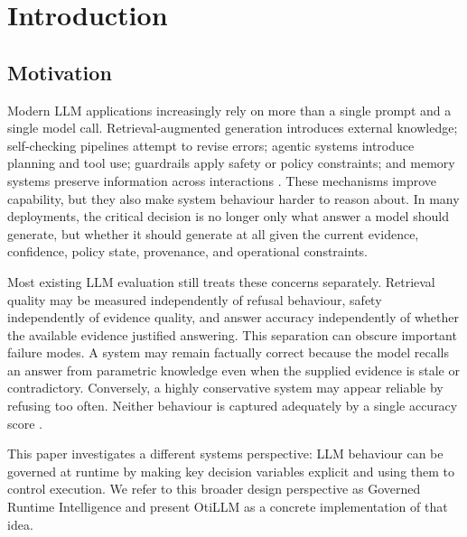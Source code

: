 \documentclass[manuscript, screen, review]{jair}
\begin{document}
\maketitle


\section{Introduction}
\subsection{Motivation}

Modern LLM applications increasingly rely on more than a single prompt and a
single model call. Retrieval-augmented generation introduces external
knowledge; self-checking pipelines attempt to revise errors; agentic systems
introduce planning and tool use; guardrails apply safety or policy constraints;
and memory systems preserve information across interactions \citep{lewis2020rag,yao2023react,dong2024safeguarding,plaat2025agentic}. These mechanisms
improve capability, but they also make system behaviour harder to reason about.
In many deployments, the critical decision is no longer only what answer a
model should generate, but whether it should generate at all given the current
evidence, confidence, policy state, provenance, and operational constraints.

Most existing LLM evaluation still treats these concerns separately. Retrieval
quality may be measured independently of refusal behaviour, safety independently
of evidence quality, and answer accuracy independently of whether the available
evidence justified answering. This separation can obscure important failure
modes. A system may remain factually correct because the model recalls an
answer from parametric knowledge even when the supplied evidence is stale or
contradictory. Conversely, a highly conservative system may appear reliable by
refusing too often. Neither behaviour is captured adequately by a single
accuracy score \citep{kamath2020selective,es2024ragas}.

This paper investigates a different systems perspective: LLM behaviour can be
governed at runtime by making key decision variables explicit and using them to
control execution. We refer to this broader design perspective as Governed
Runtime Intelligence and present OtiLLM as a concrete implementation of that
idea.
\end{document}
